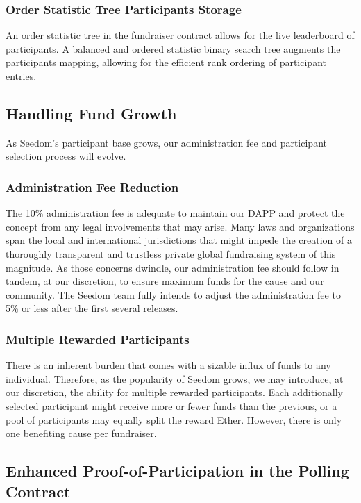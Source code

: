 \documentclass[11pt]{article}
\begin{document}
\subsubsection{Order Statistic Tree Participants Storage}

An order statistic tree \cite{5} in the fundraiser contract allows for the live leaderboard of participants. A balanced and ordered statistic binary search tree augments the participants mapping, allowing for the efficient rank ordering of participant entries.

\subsection{Handling Fund Growth}

As Seedom's participant base grows, our administration fee and participant selection process will evolve.

\subsubsection{Administration Fee Reduction}

The 10\% administration fee is adequate to maintain our DAPP and protect the concept from any legal involvements that may arise. Many laws and organizations span the local and international jurisdictions that might impede the creation of a thoroughly transparent and trustless private global fundraising system of this magnitude. As those concerns dwindle, our administration fee should follow in tandem, at our discretion, to ensure maximum funds for the cause and our community. The Seedom team fully intends to adjust the administration fee to 5\% or less after the first several releases.

\subsubsection{Multiple Rewarded Participants}

There is an inherent burden that comes with a sizable influx of funds to any individual. Therefore, as the popularity of Seedom grows, we may introduce, at our discretion, the ability for multiple rewarded participants. Each additionally selected participant might receive more or fewer funds than the previous, or a pool of participants may equally split the reward Ether. However, there is only one benefiting cause per fundraiser.

\subsection{Enhanced Proof-of-Participation in the Polling Contract}
\label{sec:enhancedProofOfParticipationInThePollingContract}
\end{document}
